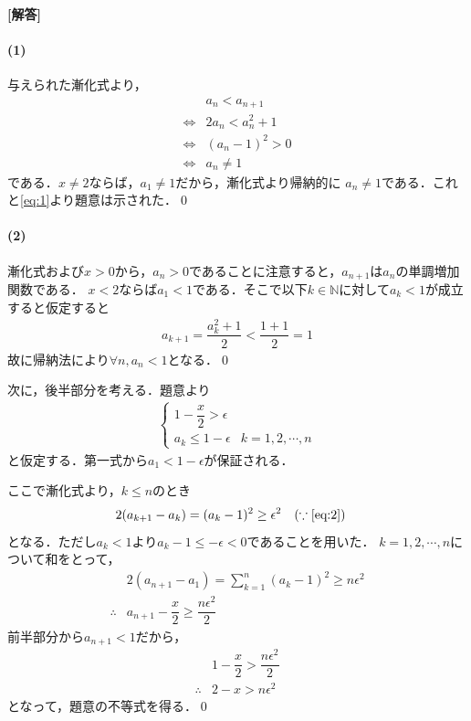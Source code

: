 \documentclass[../../main.tex]{subfiles}
\begin{document}
\begin{oframed}
  
\end{oframed}

{\bf [解答]}

\paragraph{(1)}

与えられた漸化式より，
\begin{align}
  &a_n<a_{n+1}\nonumber\\
  \Longleftrightarrow&2a_n<a_n^2+1\nonumber\\
  \Longleftrightarrow&(a_n-1)^2>0\nonumber\\
  \Longleftrightarrow&a_n\not=1\label{eq:1}
\end{align}
である．$x\not=2$ならば，$a_1\not=1$だから，漸化式より帰納的に
$a_n\not=1$である．これと\cref{eq:1}より題意は示された．\qed

\paragraph{(2)}

漸化式および$x>0$から，$a_n>0$であることに注意すると，$a_{n+1}$は$a_n$の単調増加関数である．
$x<2$ならば$a_1<1$である．そこで以下$k\in\mathbb{N}$に対して$a_k<1$が成立すると仮定すると
\begin{align}
  a_{k+1}=\dfrac{a_k^2+1}{2}<\dfrac{1+1}{2}=1
\end{align}
故に帰納法により$\forall n,a_n<1$となる．\qed

次に，後半部分を考える．題意より
\begin{align}
  \left\{
    \begin{array}{ll}
      1-\dfrac{x}{2}>\epsilon\\
      a_k\le 1-\epsilon&k=1,2,\cdots,n
    \end{array}\right.\label{eq:2}
  \end{align}
  と仮定する．第一式から$a_1<1-\epsilon$が保証される．

  ここで漸化式より，$k\le n$のとき
  \begin{align}
    &2(a_{k+1}-a_k)=(a_k-1)^2 \ge \epsilon^2 \quad (\because\cref{eq:2})
  \end{align}
  となる．ただし$a_k<1$より$a_k-1 \le -\epsilon < 0$であることを用いた．
  $k=1,2,\cdots,n$について和をとって，
  \begin{align}
    & 2(a_{n+1}-a_1)=\sum_{k=1}^n (a_k-1)^2 \ge n\epsilon^2 \\
    \therefore
    & a_{n+1}-\dfrac{x}{2} \ge \dfrac{n\epsilon^2}{2}
  \end{align}
  前半部分から$a_{n+1}<1$だから，
  \begin{align}
    & 1-\dfrac{x}{2}>\dfrac{n\epsilon^2}{2} \\
    \therefore
    & 2-x>n\epsilon^2
  \end{align}
  となって，題意の不等式を得る．\qed
  \newpage
  
\end{document}
